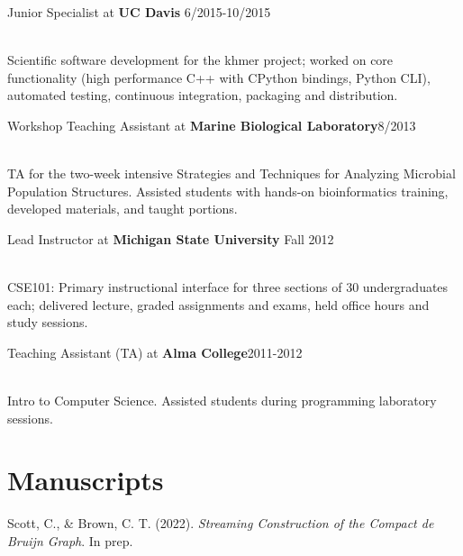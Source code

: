\documentclass[resmargin,12pt]{camille_resume}
\begin{document}
\begin{resume}
\begin{list1}
\item[] Junior Specialist at {\bf UC Davis} \hfill 6/2015-10/2015\\\\
\begin{workdesc}
Scientific software development for the khmer project; worked on core functionality (high performance 
C++ with CPython bindings, Python CLI), automated testing, continuous integration, packaging and distribution.
\end{workdesc}

\item[] Workshop Teaching Assistant at {\bf Marine Biological Laboratory}\hfill 8/2013\\\\
\begin{workdesc}
TA for the two-week intensive Strategies and Techniques for Analyzing Microbial Population Structures.
Assisted students with hands-on bioinformatics training, developed materials, and taught portions.
\end{workdesc}

\item[] Lead Instructor at {\bf Michigan State University} \hfill Fall 2012\\\\
\begin{workdesc}
CSE101: Primary instructional interface for three sections of 30 undergraduates each; 
delivered lecture, graded assignments and exams, held office hours and study sessions.
\end{workdesc}

\item[] Teaching Assistant (TA) at {\bf Alma College}\hfill 2011-2012\\\\
\begin{workdesc}
Intro to Computer Science. Assisted students during programming laboratory sessions.
\end{workdesc}

\end{list1}




\section{\mysidestyle Manuscripts}

Scott, C., \& Brown, C. T. (2022). {\em Streaming Construction of the Compact de Bruijn Graph}. In prep.


\end{resume}
\end{document}
